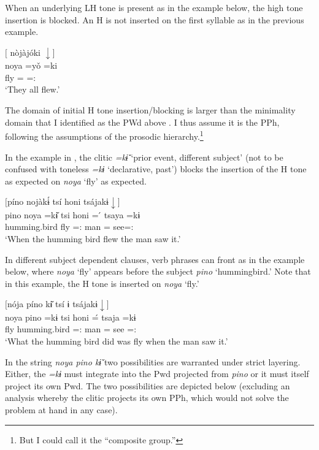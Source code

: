 \documentclass[output=paper,hidelinks]{langscibook}
\begin{document}
When an underlying LH tone is present as in the example below, the high tone insertion is blocked. An H is not inserted on the first syllable as in the previous example.

\ea 
    $[$ nòjàjóki $\downarrow]$ \\
    \gll noya =yǒ =ki \\
        fly =\Compl{} =\Decl{}:\Pst{} \\ 
    \glt `They all flew.'
\z 

The domain of initial H tone insertion/blocking is larger than the minimality domain that I identified as the PWd above \citep{tallman2018grammar}. I thus assume it is the PPh, following the assumptions of the prosodic hierarchy.\footnote{But I could call it the ``composite group.''}

In the example in , the clitic \textit{=kɨ̌} `prior event, different subject' (not to be confused with toneless \textit{=kɨ} `declarative, past') blocks the insertion of the H tone as expected on \textit{noya} `fly' as expected.

\ea \label{ex:chacobodifferentsubject1}
    $[$píno nojàkɨ́ tsí honi tsájakɨ$\downarrow]$ \\
    \gll pino noya =kɨ̌ tsi honi = ́  tsaya =kɨ \\
    humming.bird fly =\Prior{}:\Ds{} \Lnk{} man =\Erg{} see=\Decl{}:\Pst{} \\
    \glt `When the humming bird flew the man saw it.'
\z 

In different subject dependent clauses, verb phrases can front as in the example below, where \textit{noya} `fly' appears before the subject \textit{pino} `hummingbird.' Note that in this example, the H tone is inserted on \textit{noya} `fly.'

\ea 
    $[$nója píno kɨ̌ tsí ɨ tsájakɨ$\downarrow]$ \\
    \gll noya pino           =kɨ             tsi honi =́ tsaja =kɨ\\
           fly humming.bird =\Prior{}:\Ds{} \Lnk{} man =\Erg{} see =\Decl{}:\Pst{} \\
    \glt `What the humming bird did was fly when the man saw it.'
\z 

In the string \textit{noya pino kɨ̌} two possibilities are warranted under strict layering. Either, the \textit{=kɨ} must integrate into the Pwd projected from \textit{pino} or it must itself project its own Pwd. The two possibilities are depicted below (excluding an analysis whereby the clitic projects its own PPh, which would not solve the problem at hand in any case).
\end{document}
